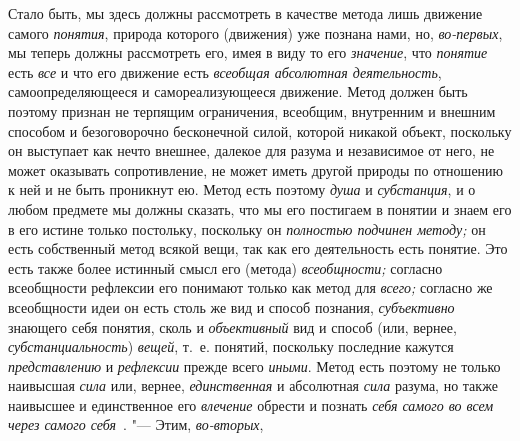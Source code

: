 Стало быть, мы здесь должны рассмотреть в качестве метода лишь
движение самого {\em понятия},
природа которого (движения) уже познана нами, но,
{\em во-первых}, мы
теперь должны рассмотреть его, имея в виду то его
{\em значение}, что
{\em понятие} есть
{\em все} и что его
движение есть {\em всеобщая абсолютная
деятельность}, самоопределяющееся и самореализующееся
движение. Метод должен быть поэтому признан не терпящим ограничения,
всеобщим, внутренним и внешним способом и безоговорочно бесконечной силой,
которой никакой объект, поскольку он выступает как нечто внешнее, далекое
для разума и независимое от него, не может оказывать сопротивление, не
может иметь другой природы по отношению к ней и не быть проникнут ею. Метод
есть поэтому {\em душа} и {\em субстанция}, и о любом предмете мы должны
сказать, что мы его постигаем в понятии и знаем его в его истине только
постольку, поскольку он {\em полностью подчинен методу;} он есть собственный
метод всякой вещи, так как его деятельность есть понятие. Это есть также более
истинный смысл его (метода) {\em всеобщности;} согласно всеобщности рефлексии
его понимают только как метод для {\em всего;} согласно же всеобщности идеи он
есть столь же вид и способ познания, {\em субъективно} знающего себя понятия,
сколь и {\em объективный} вид и способ (или, вернее, {\em субстанциальность})
{\em вещей}, т.~е. понятий, поскольку последние кажутся {\em представлению}
и {\em рефлексии} прежде всего {\em иными}. Метод есть поэтому не только
наивысшая {\em сила} или, вернее, {\em единственная} и абсолютная {\em сила}
разума, но также наивысшее и единственное его {\em влечение} обрести и познать
{\em себя самого во всем через самого себя~}. "--- Этим, {\em во-вторых},
